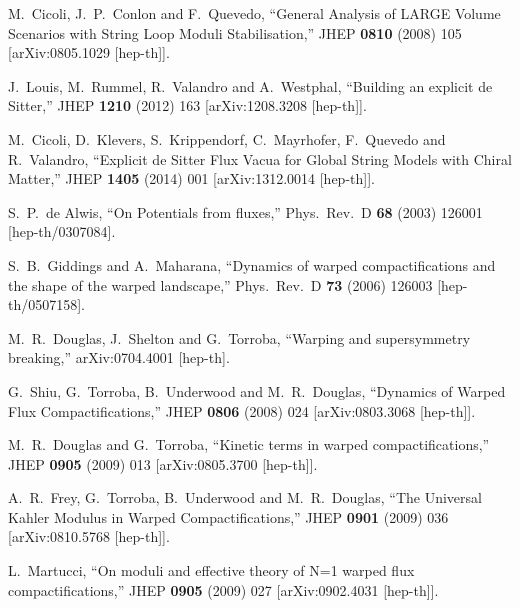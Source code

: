 \documentclass[11pt,a4paper]{article}
\begin{document}
\begin{itemize}
\begin{thebibliography}{99}
  M.~Cicoli, J.~P.~Conlon and F.~Quevedo,
  ``General Analysis of LARGE Volume Scenarios with String Loop Moduli Stabilisation,''
  JHEP {\bf 0810} (2008) 105
  [arXiv:0805.1029 [hep-th]].

  J.~Louis, M.~Rummel, R.~Valandro and A.~Westphal,
  ``Building an explicit de Sitter,''
  JHEP {\bf 1210} (2012) 163
  [arXiv:1208.3208 [hep-th]].

  M.~Cicoli, D.~Klevers, S.~Krippendorf, C.~Mayrhofer, F.~Quevedo and R.~Valandro,
  ``Explicit de Sitter Flux Vacua for Global String Models with Chiral Matter,''
  JHEP {\bf 1405} (2014) 001
  [arXiv:1312.0014 [hep-th]].

  S.~P.~de Alwis,
  ``On Potentials from fluxes,''
  Phys.\ Rev.\ D {\bf 68} (2003) 126001
  [hep-th/0307084].
  
  S.~B.~Giddings and A.~Maharana,
  ``Dynamics of warped compactifications and the shape of the warped landscape,''
  Phys.\ Rev.\ D {\bf 73} (2006) 126003
  [hep-th/0507158].

  M.~R.~Douglas, J.~Shelton and G.~Torroba,
  ``Warping and supersymmetry breaking,''
  arXiv:0704.4001 [hep-th].

  G.~Shiu, G.~Torroba, B.~Underwood and M.~R.~Douglas,
  ``Dynamics of Warped Flux Compactifications,''
  JHEP {\bf 0806} (2008) 024
  [arXiv:0803.3068 [hep-th]].
	
  M.~R.~Douglas and G.~Torroba,
  ``Kinetic terms in warped compactifications,''
  JHEP {\bf 0905} (2009) 013
  [arXiv:0805.3700 [hep-th]].
	
  A.~R.~Frey, G.~Torroba, B.~Underwood and M.~R.~Douglas,
  ``The Universal Kahler Modulus in Warped Compactifications,''
  JHEP {\bf 0901} (2009) 036
  [arXiv:0810.5768 [hep-th]].	
	
  L.~Martucci,
  ``On moduli and effective theory of N=1 warped flux compactifications,''
  JHEP {\bf 0905} (2009) 027
  [arXiv:0902.4031 [hep-th]].


\end{thebibliography}
\end{itemize}
\end{document}
